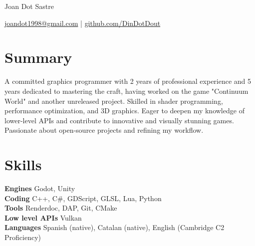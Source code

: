 \documentclass[10pt]{article}       %
\begin{document}
\centerline{\Huge Joan Dot Sastre}

\vspace{5pt}

\centerline{\href{mailto:joandot1998@gmail.com}{joandot1998@gmail.com} | \href{https://github.com/DinDotDout}{github.com/DinDotDout}}

\vspace{-10pt}
\section*{Summary}
A committed graphics programmer with 2 years of professional experience and 5 years dedicated to mastering the craft, having worked on the game "Continuum World" and another unreleased project. Skilled in shader programming, performance optimization, and 3D graphics. Eager to deepen my knowledge of lower-level APIs and contribute to innovative and visually stunning games. Passionate about open-source projects and refining my workflow.
\section*{Skills}
\textbf{Engines} Godot, Unity \\
\textbf{Coding} C++, C\#, GDScript, GLSL, Lua, Python \\
\textbf{Tools} Renderdoc, DAP, Git, CMake \\
\textbf{Low level APIs} Vulkan \\
\textbf{Languages} Spanish (native), Catalan (native), English (Cambridge C2 Proficiency)

\vspace{-6.5pt}
\end{document}
